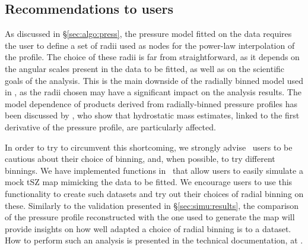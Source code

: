 \subsection{Recommendations to users}


As discussed in \S\ref{sec:algo:press}, the pressure model fitted on the data requires the user to define a set of radii used as nodes for the power-law interpolation of the profile.
The choice of these radii is far from straightforward, as it depends on the angular scales present in the data to be fitted, as well as on the scientific goals of the analysis.
This is the main downside of the radially binned model used in \panco, as the radii chosen may have a significant impact on the analysis results.
The model dependence of products derived from radially-binned pressure profiles has been discussed by \citet{munoz-echeverria_multi-probe_2022}, who show that hydrostatic mass estimates, linked to the first derivative of the pressure profile, are particularly affected.

In order to try to circumvent this shortcoming, we strongly advise \panco\ users to be cautious about their choice of binning, and, when possible, to try different binnings.
We have implemented functions in \panco\ that allow users to easily simulate a mock tSZ map mimicking the data to be fitted.
We encourage users to use this functionality to create such datasets and try out their choices of radial binning on these.
Similarly to the validation presented in \S\ref{sec:simu:results}, the comparison of the pressure profile reconstructed with the one used to generate the map will provide insights on how well adapted a choice of radial binning is to a dataset.
How to perform such an analysis is presented in the technical documentation, at .
